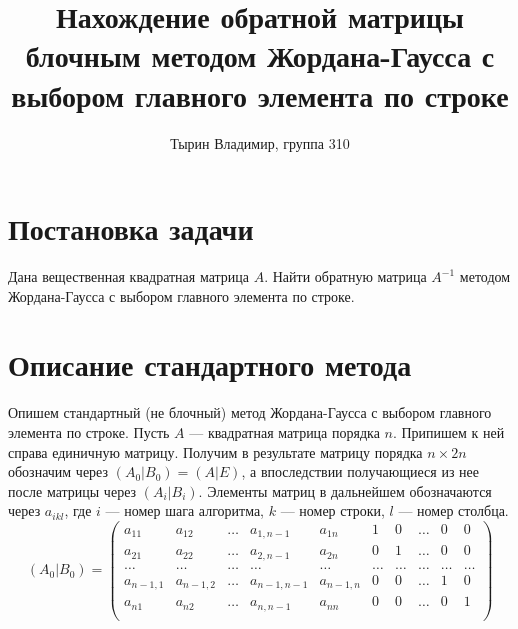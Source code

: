 \documentclass[12pt, russian]{article}
\title{Нахождение обратной матрицы блочным методом Жордана-Гаусса с выбором главного элемента по строке}
\author{Тырин Владимир, группа 310}
\date{}
\begin{document}
\maketitle

\section{Постановка задачи}
Дана вещественная квадратная матрица $A$. Найти обратную матрица $A^{-1}$ методом Жордана-Гаусса с выбором главного элемента по строке.

\section{Описание стандартного метода}

Опишем стандартный (не блочный) метод Жордана-Гаусса с выбором главного элемента по строке.
Пусть $A$ --- квадратная матрица порядка $n$. Припишем к ней справа единичную матрицу. Получим в результате матрицу порядка $n\times 2n$ обозначим через $(A_0|B_0) = (A|E)$, а впоследствии получающиеся из нее после матрицы через $(A_i|B_i)$. Элементы матриц в дальнейшем обозначаются через $a_{ikl}$, где $i$ --- номер шага алгоритма, $k$ --- номер строки, $l$ --- номер столбца.
\[
(A_0|B_0) = \left(
\begin{array} {rrrrr|rrrrr}
a_{11} & a_{12} & \ldots & a_{1,n-1} & a_{1n} & 1 & 0 & \ldots & 0 & 0 \\
a_{21} & a_{22} & \ldots & a_{2,n-1} & a_{2n} & 0 & 1 & \ldots & 0 & 0 \\
\ldots & \ldots & \ldots & \ldots & \ldots & \ldots & \ldots & \ldots & \ldots & \ldots \\
a_{n-1,1} & a_{n-1,2} & \ldots & a_{n-1,n-1} & a_{n-1,n} & 0 & 0 & \ldots & 1 & 0 \\
a_{n1} & a_{n2} & \ldots & a_{n,n-1} & a_{nn} & 0 & 0 & \ldots & 0 & 1 \\
\end{array}
\right)
\]
\end{document}
